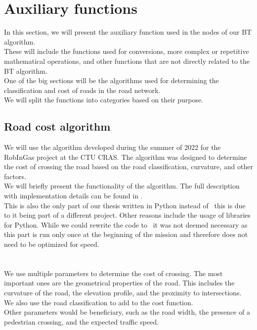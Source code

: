 \section{Auxiliary functions}
    In this section, we will present the auxiliary function used in the nodes of our BT algorithm.\\
    These will include the functions used for conversions, more complex or repetitive mathematical operations, and other functions that are not directly related to the BT algorithm.\\
    One of the big sections will be the algorithms used for determining the classification and cost of roads in the road network.\\
    We will split the functions into categories based on their purpose.

    \subsection{Road cost algorithm}
        \label{sec:road_cost}
        We will use the algorithm developed during the summer of 2022 for the RobInGas project at the CTU CRAS. The algorithm was designed to determine the cost of crossing the road based on the road classification, curvature, and other factors.\\
        We will briefly present the functionality of the algorithm. The full description with implementation details can be found in \cite{Road_cost_docs}.\\
        This is also the only part of our thesis written in Python instead of \CC\ this is due to it being part of a different project. Other reasons include the usage of libraries for Python. While we could rewrite the code to \CC\ it was not deemed necessary as this part is run only once at the beginning of the mission and therefore does not need to be optimized for speed.\\\\
        \\
            We use multiple parameters to determine the cost of crossing. The most important ones are the geometrical properties of the road. This includes the curvature of the road, the elevation profile, and the proximity to intersections. We also use the road classification to add to the cost function.\\
            Other parameters would be beneficiary, such as the road width, the presence of a pedestrian crossing, and the expected traffic speed.\\

